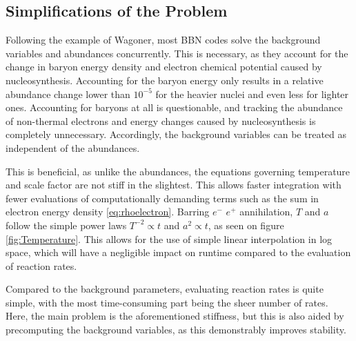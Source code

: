 \subsection{Simplifications of the Problem}
Following the example of Wagoner, most BBN codes solve the background variables and abundances concurrently. This is necessary, as they account for the change in baryon energy density and electron chemical potential caused by nucleosynthesis. Accounting for the baryon energy only results in a relative abundance change lower than $10^{-5}$ for the heavier nuclei and even less for lighter ones. Accounting for baryons at all is questionable, and tracking the abundance of non-thermal electrons and energy changes caused by nucleosynthesis is completely unnecessary. Accordingly, the background variables can be treated as independent of the abundances.

This is beneficial, as unlike the abundances, the equations governing temperature and scale factor are not stiff in the slightest. This allows faster integration with fewer evaluations of computationally demanding terms such as the sum in electron energy density \cref{eq:rhoelectron}. Barring $e^-$ $e^+$ annihilation, $T$ and $a$ follow the simple power laws $T^{-2}\propto t$ and $a^2\propto t$, as seen on figure \ref{fig:Temperature}. This allows for the use of simple linear interpolation in log space, which will have a negligible impact on runtime compared to the evaluation of reaction rates.

Compared to the background parameters, evaluating reaction rates is quite simple, with the most time-consuming part being the sheer number of rates. Here, the main problem is the aforementioned stiffness, but this is also aided by precomputing the background variables, as this demonstrably improves stability.

\clearpage

